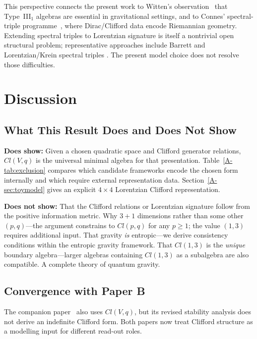\documentclass[12pt,a4paper,openany]{book}
\begin{document}
This perspective connects the present work to Witten's observation~\cite{Witten2018} that Type~III$_1$ algebras are essential in gravitational settings, and to Connes' spectral-triple programme~\cite{Connes1994}, where Dirac/Clifford data encode Riemannian geometry.  Extending spectral triples to Lorentzian signature is itself a nontrivial open structural problem; representative approaches include Barrett and Lorentzian/Krein spectral triples \cite{Barrett2007,PaschkeSitarz2006,VandenDungen2016}.  The present model choice does not resolve those difficulties.

\section{Discussion}
\label{A-sec:discussion}

\subsection{What This Result Does and Does Not Show}

\textbf{Does show:}
Given a chosen quadratic space and Clifford generator relations, $Cl(V,q)$ is the universal minimal algebra for that presentation.
Table~\ref{A-tab:exclusion} compares which candidate frameworks encode the chosen form internally and which require external representation data.
Section~\ref{A-sec:toymodel} gives an explicit $4\times4$ Lorentzian Clifford representation.

\textbf{Does not show:}
That the Clifford relations or Lorentzian signature follow from the positive information metric.
Why $3+1$ dimensions rather than some other $(p,q)$---the argument constrains to $Cl(p,q)$ for any $p \geq 1$; the value $(1,3)$ requires additional input.
That gravity \emph{is} entropic---we derive consistency conditions within the entropic gravity framework.
That $Cl(1,3)$ is the \emph{unique} boundary algebra---larger algebras containing $Cl(1,3)$ as a subalgebra are also compatible.
A complete theory of quantum gravity.

\subsection{Convergence with Paper B}

The companion paper~\cite{Liu2026QRAIF_B} also uses $Cl(V,q)$, but its revised stability analysis does not derive an indefinite Clifford form.  Both papers now treat Clifford structure as a modelling input for different read-out roles.
\end{document}
